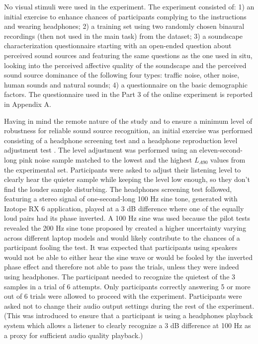 \documentclass[
  authoryear,
  preprint,
  3p,
  onecolumn]{elsarticle}
\begin{document}
No visual stimuli were used in the experiment. The experiment consisted
of: 1) an initial exercise to enhance chances of participants complying
to the instructions and wearing headphones; 2) a training set using two
randomly chosen binaural recordings (then not used in the main task)
from the dataset; 3) a soundscape characterization questionnaire
starting with an open-ended question about perceived sound sources and
featuring the same questions as the one used in situ, looking into the
perceived affective quality of the soundscape and the perceived sound
source dominance of the following four types: traffic noise, other
noise, human sounds and natural sounds; 4) a questionnaire on the basic
demographic factors. The questionnaire used in the Part 3 of the online
experiment is reported in Appendix A.

Having in mind the remote nature of the study and to ensure a minimum
level of robustness for reliable sound source recognition, an initial
exercise was performed consisting of a headphone screening test
\citep{Woods2017Headphone} and a headphone reproduction level adjustment
test \citep{Gontier2019Estimation}. The level adjustment was performed
using an eleven-second-long pink noise sample matched to the lowest and
the highest \(L_{A90}\) values from the experimental set. Participants
were asked to adjust their listening level to clearly hear the quieter
sample while keeping the level low enough, so they don't find the louder
sample disturbing. The headphones screening test followed, featuring a
stereo signal of one-second-long 100 Hz sine tone, generated with
Izotope RX 6 application, played at a 3 dB difference where one of the
equally loud pairs had its phase inverted. A 100 Hz sine was used
because the pilot tests revealed the 200 Hz sine tone proposed by
\citet{Woods2017Headphone} created a higher uncertainty varying across
different laptop models and would likely contribute to the chances of a
participant fooling the test. It was expected that participants using
speakers would not be able to either hear the sine wave or would be
fooled by the inverted phase effect and therefore not able to pass the
trials, unless they were indeed using headphones. The participant needed
to recognize the quietest of the 3 samples in a trial of 6 attempts.
Only participants correctly answering 5 or more out of 6 trials were
allowed to proceed with the experiment. Participants were asked not to
change their audio output settings during the rest of the experiment.
(This was introduced to ensure that a participant is using a headphones
playback system which allows a listener to clearly recognize a 3 dB
difference at 100 Hz as a proxy for sufficient audio quality playback.)
\end{document}
